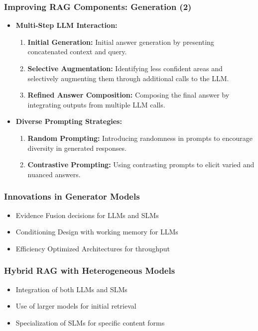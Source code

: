 \begin{frame}[fragile]\frametitle{Improving RAG Components: Generation (2)}
  \begin{itemize}
    \item \textbf{Multi-Step LLM Interaction:}
      \begin{enumerate}
        \item \textbf{Initial Generation:} Initial answer generation by presenting concatenated context and query.
        \item \textbf{Selective Augmentation:} Identifying less confident areas and selectively augmenting them through additional calls to the LLM.
        \item \textbf{Refined Answer Composition:} Composing the final answer by integrating outputs from multiple LLM calls.
      \end{enumerate}
    \item \textbf{Diverse Prompting Strategies:}
      \begin{enumerate}
        \item \textbf{Random Prompting:} Introducing randomness in prompts to encourage diversity in generated responses.
        \item \textbf{Contrastive Prompting:} Using contrasting prompts to elicit varied and nuanced answers.
      \end{enumerate}
  \end{itemize}
\end{frame}



\begin{frame}[fragile]\frametitle{Innovations in Generator Models}
  \begin{itemize}
    \item Evidence Fusion decisions for LLMs and SLMs
    \item Conditioning Design with working memory for LLMs
    \item Efficiency Optimized Architectures for throughput
  \end{itemize}
\end{frame}

\begin{frame}[fragile]\frametitle{Hybrid RAG with Heterogeneous Models}
  \begin{itemize}
    \item Integration of both LLMs and SLMs
    \item Use of larger models for initial retrieval
    \item Specialization of SLMs for specific content forms
  \end{itemize}
\end{frame}

